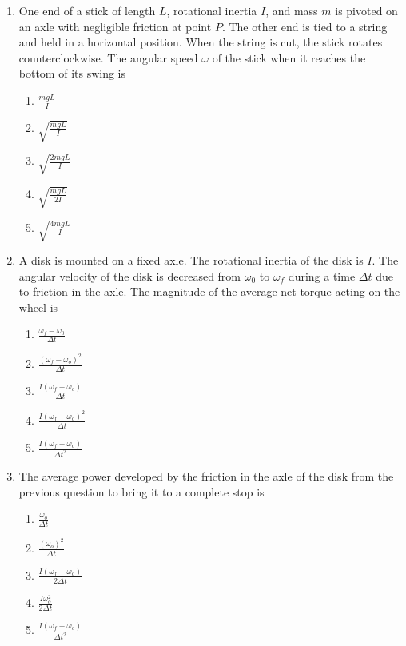 \documentclass{../../oss-apphys}
\begin{document}
\begin{multicols}{2}
\begin{enumerate}[leftmargin=18pt]
  \item One end of a stick of length $L$, rotational inertia $I$, and mass $m$
    is pivoted on an axle with negligible friction at point $P$. The other end
    is tied to a string and held in a horizontal position. When the string is
    cut, the stick rotates counterclockwise. The angular speed $\omega$ of the
    stick when it reaches the bottom of its swing is
    \begin{center}
    \end{center}
    \begin{enumerate}[noitemsep,topsep=0pt,leftmargin=18pt,label=(\Alph*)]
    \item$\displaystyle\frac{mgL}{I}$
    \item$\displaystyle\sqrt{\frac{mgL}{I}}$
    \item$\displaystyle\sqrt{\frac{2mgL}{I}}$
    \item$\displaystyle\sqrt{\frac{mgL}{2I}}$
    \item$\displaystyle\sqrt{\frac{4mgL}{I}}$
    \end{enumerate}

  \item A disk is mounted on a fixed axle. The rotational inertia of the disk is
    $I$. The angular velocity of the disk is decreased from $\omega_0$ to
    $\omega_f$ during a time $\Delta t$ due to friction in the axle. The
    magnitude of the average net torque acting on the wheel is
    \begin{enumerate}[noitemsep,topsep=0pt,leftmargin=18pt,label=(\Alph*)]
    \item $\displaystyle\frac{\omega_f-\omega_0}{\Delta t}$
    \item $\displaystyle\frac{(\omega_f-\omega_o)^2}{\Delta t}$
    \item $\displaystyle\frac{I(\omega_f-\omega_o)}{\Delta t}$
    \item $\displaystyle\frac{I(\omega_f-\omega_o)^2}{\Delta t}$
    \item $\displaystyle\frac{I(\omega_f-\omega_o)}{\Delta t^2}$
    \end{enumerate}
    \columnbreak
    
  \item The average power developed by the friction in the axle of the disk
    from the previous question to bring it to a complete stop is
    \begin{enumerate}[noitemsep,topsep=0pt,leftmargin=18pt,label=(\Alph*)]
    \item $\displaystyle\frac{\omega_o}{\Delta t}$
    \item $\displaystyle\frac{(\omega_o)^2}{\Delta t}$
    \item $\displaystyle\frac{I(\omega_f-\omega_o)}{2\Delta t}$
    \item $\displaystyle\frac{I\omega_o^2}{2\Delta t}$
    \item $\displaystyle\frac{I(\omega_f-\omega_o)}{\Delta t^2}$
    \end{enumerate}
    

\end{enumerate}
\end{multicols}
\end{document}
